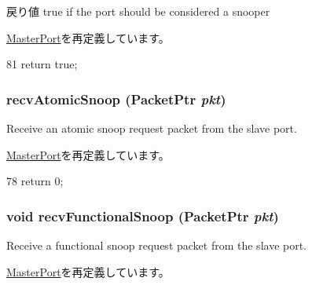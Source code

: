 \begin{DoxyReturn}{戻り値}
true if the port should be considered a snooper 
\end{DoxyReturn}


\hyperlink{classMasterPort_a32602a6a3c3d66a639455036d6c08dd6}{MasterPort}を再定義しています。


\begin{DoxyCode}
81 { return true; }
\end{DoxyCode}
\hypertarget{classX86ISA_1_1Walker_1_1WalkerPort_a886d584c81ee4e398ff8069907f6e1a5}{
\subsubsection[{recvAtomicSnoop}]{ recvAtomicSnoop ({\bf PacketPtr} {\em pkt})}}
\label{classX86ISA_1_1Walker_1_1WalkerPort_a886d584c81ee4e398ff8069907f6e1a5}
Receive an atomic snoop request packet from the slave port. 

\hyperlink{classMasterPort_ae1160d8f94f042aba1dc9a07a72e1e82}{MasterPort}を再定義しています。


\begin{DoxyCode}
78 { return 0; }
\end{DoxyCode}
\hypertarget{classX86ISA_1_1Walker_1_1WalkerPort_a284dfb90c168233c9d416bc07de8fefe}{
\subsubsection[{recvFunctionalSnoop}]{\setlength{\rightskip}{0pt plus 5cm}void recvFunctionalSnoop ({\bf PacketPtr} {\em pkt})}}
\label{classX86ISA_1_1Walker_1_1WalkerPort_a284dfb90c168233c9d416bc07de8fefe}
Receive a functional snoop request packet from the slave port. 

\hyperlink{classMasterPort_af5b15bc08781cf0ba6190efc37d5b67e}{MasterPort}を再定義しています。


